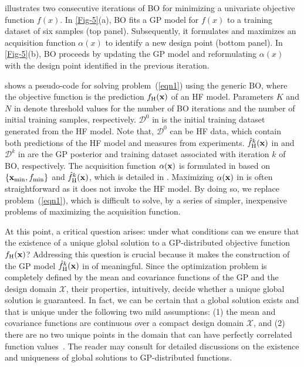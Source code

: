 \documentclass[journal ]{new-aiaa}
\newcommand{\edit}[1]{\textcolor{red!80!black}{#1}} %
\begin{document}
	 illustrates two consecutive iterations of BO for minimizing a univariate objective function $f(x)$.
	In \cref{Fig-5}(a), BO fits a GP model for $f(x)$ to a training dataset of six samples (top panel).
	Subsequently, it formulates and maximizes an acquisition function $\alpha(x)$ to identify a new design point (bottom panel).
	In \cref{Fig-5}(b), BO proceeds by updating the GP model and reformulating $\alpha(x)$ with the design point identified in the previous iteration.
	
	 shows a pseudo-code for solving problem~(\ref{eqn1}) using the generic BO, where the objective function is the prediction $f_\text{H}(\bf x)$ of an HF model.
	Parameters $K$ and $N$ in  denote threshold values for the number of BO iterations and the number of initial training samples, respectively.
	$\mathcal{D}^{0}$ in  is the initial training dataset generated from the HF model.
	Note that, $\mathcal{D}^{0}$ can be HF data, which contain both predictions of the HF model and measures from experiments.  
	$\hat{f}_\text{H}^k({\bf x})$ in  and $\mathcal{D}^{k}$ in  are the GP posterior and training dataset associated with iteration $k$ of BO, respectively.
	The acquisition function $\alpha({\bf x})$ is formulated in  based on $\{{\bf x}_{\min},f_{\min}\}$ and $\hat{f}_\text{H}^k({\bf x})$, which is detailed in .
	Maximizing $\alpha({\bf x})$ in  is often straightforward as it does not invoke the HF model.
	{By doing so, we replace problem~(\ref{eqn1}), which is difficult to solve, by a series of simpler, inexpensive problems of maximizing the acquisition function.}
	
	{At this point, a critical question arises: under what conditions can we ensure that the existence of a unique global solution to a GP-distributed objective function ${f}_\text{H}({\bf x})$?
		Addressing this question is crucial because it makes the construction of the GP model $\hat{f}_\text{H}^k({\bf x})$ in  of  meaningful.
		Since the optimization problem is completely defined by the mean and covariance functions of the GP and the design domain $\mathcal{X}$, their properties, intuitively, decide whether a unique global solution is guaranteed.
		In fact, we can be certain that a global solution exists and that is unique under the following two mild assumptions: (1) the mean and covariance functions are continuous over a compact design domain $\mathcal{X}$, and (2) there are no two unique points in the domain that can have perfectly correlated function values~\citep{Garnett2023}.
		The reader may consult \citet{Garnett2023} for detailed discussions on the existence and uniqueness of global solutions to GP-distributed functions.} 
	
\end{document}
